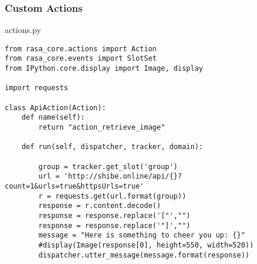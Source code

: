 
  








 \begin{frame}[fragile]\frametitle{Custom Actions}

 actions.py

  
\begin{lstlisting}
from rasa_core.actions import Action
from rasa_core.events import SlotSet
from IPython.core.display import Image, display

import requests

class ApiAction(Action):
    def name(self):
        return "action_retrieve_image"

    def run(self, dispatcher, tracker, domain):
        
        group = tracker.get_slot('group')
        url = 'http://shibe.online/api/{}?count=1&urls=true&httpsUrls=true'
        r = requests.get(url.format(group))
        response = r.content.decode()
        response = response.replace('["',"")
        response = response.replace('"]',"")
		message = "Here is something to cheer you up: {}"
        #display(Image(response[0], height=550, width=520))
        dispatcher.utter_message(message.format(response))
\end{lstlisting}

\end{frame}


